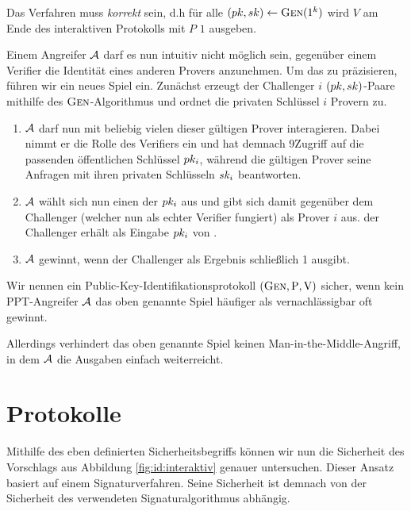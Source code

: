 Das Verfahren muss \emph{korrekt} sein, d.h für alle $(pk, sk)
\leftarrow \textsc{Gen}(1^k)$ wird $V$ am Ende des interaktiven Protokolls mit
$P$ $1$ ausgeben. 

Einem Angreifer $\mathcal{A}$ darf es nun intuitiv nicht möglich sein, gegenüber
einem Verifier die Identität eines anderen Provers anzunehmen. Um das zu
präzisieren, führen wir ein neues Spiel ein. Zunächst erzeugt der Challenger $i$
$(pk, sk)$-Paare mithilfe des $\textsc{Gen}$-Algorithmus und ordnet die privaten Schlüssel $i$ Provern zu.
\begin{enumerate}
  \item $\mathcal{A}$ darf nun mit beliebig vielen dieser gültigen Prover
    interagieren. Dabei nimmt er die Rolle des Verifiers ein und hat demnach
    9Zugriff auf die passenden öffentlichen Schlüssel $pk_i$, während die
    gültigen Prover seine Anfragen mit ihren privaten Schlüsseln $sk_i$
    beantworten.
  \item $\mathcal{A}$ wählt sich nun einen der $pk_{i}$ aus und gibt sich
    damit gegenüber dem Challenger (welcher nun als \glqq echter\grqq{}
    Verifier fungiert) als Prover $i$ aus. der Challenger erhält als
    Eingabe $pk_i$ von \A.
  \item $\mathcal{A}$ gewinnt, wenn der Challenger als Ergebnis schließlich 1
ausgibt.
\end{enumerate} Wir nennen ein Public-Key-Identifikationsprotokoll
$(\textsc{Gen}, \mathrm{P}, \mathrm{V})$ sicher, wenn kein PPT-Angreifer $\mathcal{A}$
das oben genannte Spiel häufiger als vernachlässigbar oft gewinnt.

Allerdings verhindert das oben genannte Spiel keinen
Man-in-the-Middle-Angriff, in dem $\mathcal{A}$ die Ausgaben einfach
weiterreicht.

\section{Protokolle}\label{sec:id:protokolle}
Mithilfe des eben definierten Sicherheitsbegriffs können wir nun die
Sicherheit des Vorschlags aus Abbildung \ref{fig:id:interaktiv} genauer untersuchen.
Dieser Ansatz basiert auf einem Signaturverfahren. Seine
Sicherheit ist demnach von der Sicherheit des verwendeten
Signaturalgorithmus abhängig.

